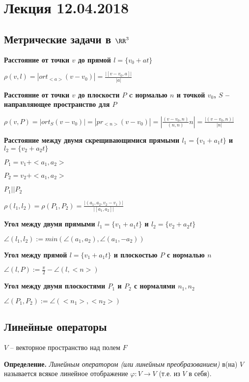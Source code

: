 \section{Лекция 12.04.2018}

\subsection{Метрические задачи в $\RR^3$}

\textbf{Расстояние от точки $v$ до прямой $l = \{v_0 + at\}$} 

$\rho(v, l) = |ort_{<a>} (v - v_0)| = \frac{|[v-v_0, a]|}{|a|}$

\bigskip
\textbf{Расстояние от точки $v$ до плоскости $P$ c нормалью $n$ и точкой $v_0$, $S$ -- направляющее пространство для $P$}

$\rho(v, P) = |ort_S (v-v_0)| = |pr_{<n>} (v-v_0)| = |\frac{(v - v_0, n)}{(n, n)} n| = \frac{|(v - v_0, n)|}{|n|}$

\bigskip
\textbf{Расстояние между двумя скрещивающимися прямыми $l_1 = \{v_1 + a_1 t\}$ и $l_2 = \{v_2 + a_2 t\}$}

$P_1 = v_1 + <a_1, a_2>$

$P_2 = v_2 + <a_1, a_2>$

$P_1 || P_2$

$\rho (l_1, l_2) = \rho (P_1, P_2) = \frac{|(a_1, a_2, v_2 - v_1)|}{|[a_1, a_2]|}$

\bigskip
\textbf{Угол между двумя прямыми $l_1 = \{v_1 + a_1 t\}$ и $l_2 = \{v_2 + a_2 t\}$}

$\angle (l_1, l_2):= min( \angle (a_1, a_2), \angle (a_1, -a_2))$

\bigskip
\textbf{Угол между прямой $l = \{v_1 + a_1 t\}$ и плоскостью  $P$ с нормалью $n$}

$\angle (l, P) := \frac{\pi}{2} - \angle (l, <n>)$

\bigskip
\textbf{Угол между двумя плоскостями $P_1$ и $P_2$ с нормалями $n_1, n_2$}

$\angle (P_1, P_2) := \angle (<n_1>, <n_2>)$

\subsection{Линейные операторы}

$V$ -- векторное пространство над полем $F$

\textbf{Определение.} \textit{Линейным оператором (или линейным преобразованием)} в(на) $V$ называется всякое линейное отображение $\varphi: V \rightarrow V$ (т.е. из $V$ в себя).

